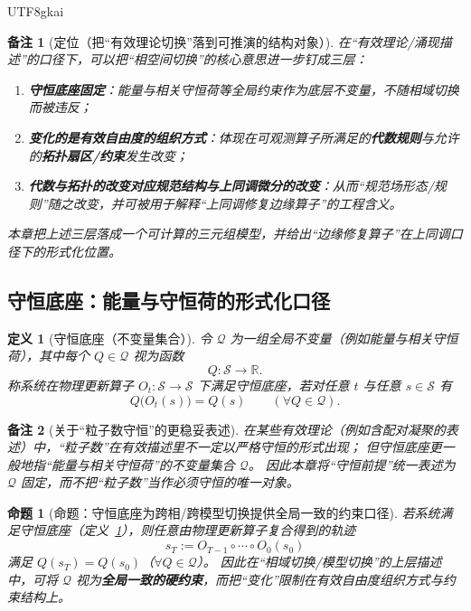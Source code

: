 \documentclass[12pt]{article}
\newtheorem{definition}{定义}[section]
\newtheorem{proposition}{命题}[section]
\newtheorem{remark}{备注}[section]
\newcommand{\RR}{\mathbb{R}}
\begin{document}
\begin{CJK*}{UTF8}{gkai}
\begin{remark}[定位（把“有效理论切换”落到可推演的结构对象）]
在“有效理论/涌现描述”的口径下，可以把“相空间切换”的核心意思进一步钉成三层：
\begin{enumerate}
  \item \textbf{守恒底座固定}：能量与相关守恒荷等全局约束作为底层不变量，不随相域切换而被违反；
  \item \textbf{变化的是有效自由度的组织方式}：体现在可观测算子所满足的\textbf{代数规则}与允许的\textbf{拓扑扇区/约束}发生改变；
  \item \textbf{代数与拓扑的改变对应规范结构与上同调微分的改变}：从而“规范场形态/规则”随之改变，并可被用于解释“上同调修复边缘算子”的工程含义。
\end{enumerate}
本章把上述三层落成一个可计算的三元组模型，并给出“边缘修复算子”在上同调口径下的形式化位置。
\end{remark}

\subsection{守恒底座：能量与守恒荷的形式化口径}
\label{sec:conserved-bedrock}

\begin{definition}[守恒底座（不变量集合）]
\label{def:conserved-bedrock}
令 $\mathcal{Q}$ 为一组全局不变量（例如能量与相关守恒荷），其中每个 $Q\in\mathcal{Q}$ 视为函数
\[
  Q:\mathcal{S}\to\RR.
\]
称系统在物理更新算子 $O_t:\mathcal{S}\to\mathcal{S}$ 下满足守恒底座，若对任意 $t$ 与任意 $s\in\mathcal{S}$ 有
\[
  Q\bigl(O_t(s)\bigr)=Q(s)\qquad(\forall Q\in\mathcal{Q}).
\]
\end{definition}

\begin{remark}[关于“粒子数守恒”的更稳妥表述]
在某些有效理论（例如含配对凝聚的表述）中，“粒子数”在有效描述里不一定以严格守恒的形式出现；
但守恒底座更一般地指“能量与相关守恒荷”的不变量集合 $\mathcal{Q}$。
因此本章将“守恒前提”统一表述为 $\mathcal{Q}$ 固定，而不把“粒子数”当作必须守恒的唯一对象。
\end{remark}

\begin{proposition}[命题：守恒底座为跨相/跨模型切换提供全局一致的约束口径]
\label{prop:conserved-bedrock-provides-global-constraints}
若系统满足守恒底座（定义~\ref{def:conserved-bedrock}），则任意由物理更新算子复合得到的轨迹
\[
  s_T := O_{T-1}\circ\cdots\circ O_0(s_0)
\]
满足 $Q(s_T)=Q(s_0)$（$\forall Q\in\mathcal{Q}$）。
因此在“相域切换/模型切换”的上层描述中，可将 $\mathcal{Q}$ 视为\textbf{全局一致的硬约束}，而把“变化”限制在有效自由度组织方式与约束结构上。
\end{proposition}


\end{CJK*}
\end{document}
